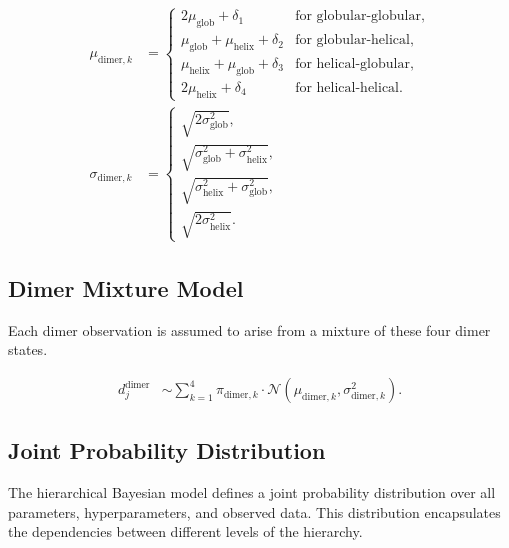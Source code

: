 \documentclass[12pt]{article}
\begin{document}
\begin{align}
    \mu_{\text{dimer}, k} &= 
    \begin{cases}
        2\mu_{\text{glob}} + \delta_1 & \text{for globular-globular}, \\
        \mu_{\text{glob}} + \mu_{\text{helix}} + \delta_2 & \text{for globular-helical}, \\
        \mu_{\text{helix}} + \mu_{\text{glob}} + \delta_3 & \text{for helical-globular}, \\
        2\mu_{\text{helix}} + \delta_4 & \text{for helical-helical}.
    \end{cases} \\
    \sigma_{\text{dimer}, k} &= 
    \begin{cases}
        \sqrt{2\sigma_{\text{glob}}^2}, \\
        \sqrt{\sigma_{\text{glob}}^2 + \sigma_{\text{helix}}^2}, \\
        \sqrt{\sigma_{\text{helix}}^2 + \sigma_{\text{glob}}^2}, \\
        \sqrt{2\sigma_{\text{helix}}^2}.
    \end{cases}
\end{align}

\subsection{Dimer Mixture Model}
Each dimer observation is assumed to arise from a mixture of these four dimer states.

\begin{align}
    d_j^{\text{dimer}} &\sim \sum_{k=1}^4 \pi_{\text{dimer}, k} 
    \cdot \mathcal{N}(\mu_{\text{dimer}, k}, \sigma_{\text{dimer}, k}^2).
\end{align}

\subsection{Joint Probability Distribution}

The hierarchical Bayesian model defines a joint probability distribution over all parameters, hyperparameters, and observed data. This distribution encapsulates the dependencies between different levels of the hierarchy.
\end{document}
